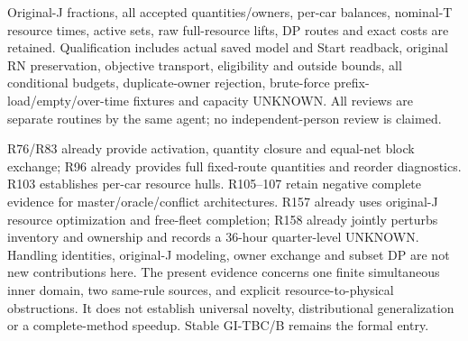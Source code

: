 \documentclass[11pt]{article}
\begin{document}
Original-J fractions, all accepted quantities/owners, per-car balances,
nominal-T resource times, active sets, raw full-resource lifts, DP routes
and exact costs are retained. Qualification includes actual saved model and
Start readback, original RN preservation, objective transport, eligibility
and outside bounds, all conditional budgets, duplicate-owner rejection,
brute-force prefix-load/empty/over-time fixtures and capacity UNKNOWN.
All reviews are separate routines by the same agent; no independent-person
review is claimed.



R76/R83 already provide activation, quantity closure and equal-net block
exchange; R96 already provides full fixed-route quantities and reorder
diagnostics. R103 establishes per-car resource hulls. R105--107 retain
negative complete evidence for master/oracle/conflict architectures.
R157 already uses original-J resource optimization and free-fleet
completion; R158 already jointly perturbs inventory and ownership and
records a 36-hour quarter-level UNKNOWN. Handling identities, original-J
modeling, owner exchange and subset DP are not new contributions here.
The present evidence concerns one finite simultaneous inner domain, two
same-rule sources, and explicit resource-to-physical obstructions. It does
not establish universal novelty, distributional generalization or a
complete-method speedup. Stable GI-TBC/B remains the formal entry.
\end{document}
